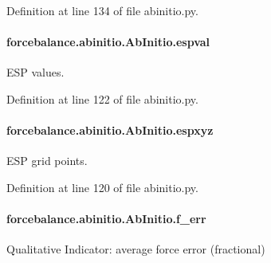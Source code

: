 Definition at line 134 of file abinitio.\-py.

\hypertarget{classforcebalance_1_1abinitio_1_1AbInitio_aba6d885086d455fce8c3d472fd08020d}{
\paragraph[{espval}]{\setlength{\rightskip}{0pt plus 5cm}forcebalance.\-abinitio.\-Ab\-Initio.\-espval}}\label{classforcebalance_1_1abinitio_1_1AbInitio_aba6d885086d455fce8c3d472fd08020d}


E\-S\-P values. 



Definition at line 122 of file abinitio.\-py.

\hypertarget{classforcebalance_1_1abinitio_1_1AbInitio_a8be2d088afb344036aae989ca3cbcc41}{
\paragraph[{espxyz}]{\setlength{\rightskip}{0pt plus 5cm}forcebalance.\-abinitio.\-Ab\-Initio.\-espxyz}}\label{classforcebalance_1_1abinitio_1_1AbInitio_a8be2d088afb344036aae989ca3cbcc41}


E\-S\-P grid points. 



Definition at line 120 of file abinitio.\-py.

\hypertarget{classforcebalance_1_1abinitio_1_1AbInitio_a176fb2b013ecc5ab451fd3b190414c4d}{
\paragraph[{f\-\_\-err}]{\setlength{\rightskip}{0pt plus 5cm}forcebalance.\-abinitio.\-Ab\-Initio.\-f\-\_\-err}}\label{classforcebalance_1_1abinitio_1_1AbInitio_a176fb2b013ecc5ab451fd3b190414c4d}


Qualitative Indicator\-: average force error (fractional) 



